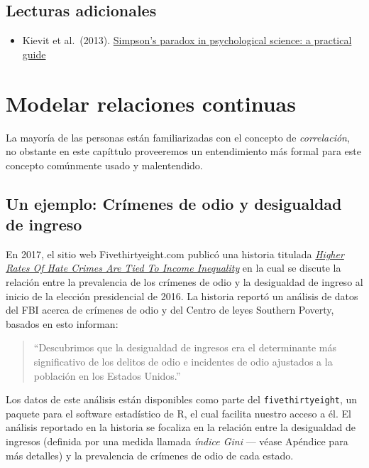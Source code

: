 \documentclass[
  12pt,
]{book}
\providecommand{\tightlist}{%
  \setlength{\itemsep}{0pt}\setlength{\parskip}{0pt}}
\begin{document}
\hypertarget{lecturas-adicionales}{%
\section{Lecturas adicionales}\label{lecturas-adicionales}}

\begin{itemize}
\tightlist
\item
  Kievit et al.~(2013). \href{https://www.frontiersin.org/articles/10.3389/fpsyg.2013.00513/full}{Simpson's paradox in psychological science: a practical guide}
\end{itemize}

\hypertarget{modeling-continuous-relationships}{%
\chapter{Modelar relaciones continuas}\label{modeling-continuous-relationships}}

La mayoría de las personas están familiarizadas con el concepto de \emph{correlación}, no obstante en este capíttulo proveeremos un entendimiento más formal para este concepto comúnmente usado y malentendido.

\hypertarget{un-ejemplo-cruxedmenes-de-odio-y-desigualdad-de-ingreso}{%
\section{Un ejemplo: Crímenes de odio y desigualdad de ingreso}\label{un-ejemplo-cruxedmenes-de-odio-y-desigualdad-de-ingreso}}

En 2017, el sitio web Fivethirtyeight.com publicó una historia titulada \href{https://fivethirtyeight.com/features/higher-rates-of-hate-crimes-are-tied-to-income-inequality/}{\emph{Higher Rates Of Hate Crimes Are Tied To Income Inequality}} en la cual se discute la relación entre la prevalencia de los crímenes de odio y la desigualdad de ingreso al inicio de la elección presidencial de 2016. La historia reportó un análisis de datos del FBI acerca de crímenes de odio y del Centro de leyes Southern Poverty, basados en esto informan:

\begin{quote}
``Descubrimos que la desigualdad de ingresos era el determinante más significativo de los delitos de odio e incidentes de odio ajustados a la población en los Estados Unidos.''
\end{quote}

Los datos de este análisis están disponibles como parte del \texttt{fivethirtyeight}, un paquete para el software estadístico de R, el cual facilita nuestro acceso a él. El análisis reportado en la historia se focaliza en la relación entre la desigualdad de ingresos (definida por una medida llamada \emph{índice Gini} --- véase Apéndice para más detalles) y la prevalencia de crímenes de odio de cada estado.
\end{document}
